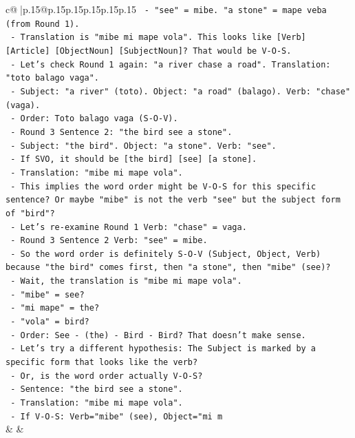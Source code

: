 \documentclass{article}
\begin{document}
{\begin{supertabular}{c@{$\;$}|p{.15\linewidth}@{}p{.15\linewidth}p{.15\linewidth}p{.15\linewidth}p{.15\linewidth}p{.15\linewidth}}
{{{\texttt{      {-} "see" = mibe. "a stone" = mape veba (from Round 1).} \\
\texttt{      {-} Translation is "mibe mi mape vola". This looks like {[}Verb{]} {[}Article{]} {[}ObjectNoun{]} {[}SubjectNoun{]}? That would be V{-}O{-}S.} \\
\texttt{      {-} Let's check Round 1 again: "a river chase a road". Translation: "toto balago vaga".} \\
\texttt{        {-} Subject: "a river" (toto). Object: "a road" (balago). Verb: "chase" (vaga).} \\
\texttt{        {-} Order: Toto balago vaga (S{-}O{-}V).} \\
\texttt{      {-} Round 3 Sentence 2: "the bird see a stone".} \\
\texttt{        {-} Subject: "the bird". Object: "a stone". Verb: "see".} \\
\texttt{        {-} If SVO, it should be {[}the bird{]} {[}see{]} {[}a stone{]}.} \\
\texttt{        {-} Translation: "mibe mi mape vola".} \\
\texttt{        {-} This implies the word order might be V{-}O{-}S for this specific sentence? Or maybe "mibe" is not the verb "see" but the subject form of "bird"?} \\
\texttt{        {-} Let's re{-}examine Round 1 Verb: "chase" = vaga.} \\
\texttt{        {-} Round 3 Sentence 2 Verb: "see" = mibe.} \\
\texttt{        {-} So the word order is definitely S{-}O{-}V (Subject, Object, Verb) because "the bird" comes first, then "a stone", then "mibe" (see)?} \\
\texttt{        {-} Wait, the translation is "mibe mi mape vola".} \\
\texttt{          {-} "mibe" = see?} \\
\texttt{          {-} "mi mape" = the?} \\
\texttt{          {-} "vola" = bird?} \\
\texttt{          {-} Order: See {-} (the) {-} Bird {-} Bird? That doesn't make sense.} \\
\texttt{        {-} Let's try a different hypothesis: The Subject is marked by a specific form that looks like the verb?} \\
\texttt{        {-} Or, is the word order actually V{-}O{-}S?} \\
\texttt{          {-} Sentence: "the bird see a stone".} \\
\texttt{          {-} Translation: "mibe mi mape vola".} \\
\texttt{          {-} If V{-}O{-}S: Verb="mibe" (see), Object="mi m} \\
            }
        }
    }
    & & \\ \\


\end{supertabular}}
\end{document}
